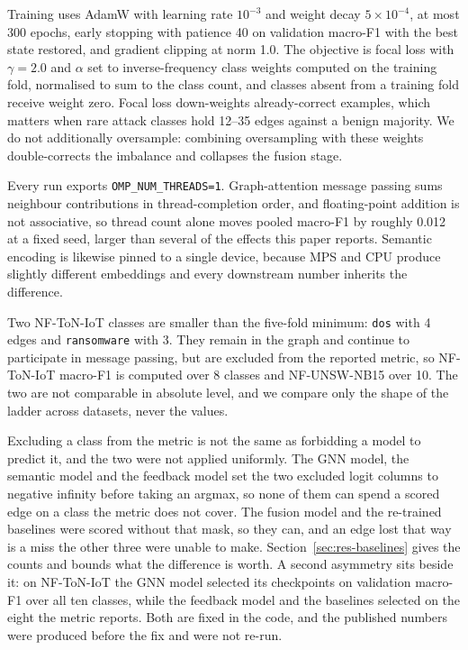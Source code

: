 Training uses AdamW \citep{loshchilov2019adamw} with learning rate $10^{-3}$ and weight decay $5\times10^{-4}$, at most 300
epochs, early stopping with patience 40 on validation macro-F1 with the best state restored,
and gradient clipping at norm 1.0. The objective is focal loss \citep{lin2017focal} with $\gamma = 2.0$ and $\alpha$
set to inverse-frequency class weights computed on the training fold, normalised to sum to the
class count, and classes absent from a training fold receive weight zero. Focal loss down-weights
already-correct examples, which matters when rare attack classes hold 12--35 edges against a
benign majority. We do not additionally oversample: combining oversampling with these weights
double-corrects the imbalance and collapses the fusion stage.

Every run exports \texttt{OMP\_NUM\_THREADS=1}. Graph-attention message passing sums neighbour
contributions in thread-completion order, and floating-point addition is not associative, so
thread count alone moves pooled macro-F1 by roughly 0.012 at a fixed seed, larger than
several of the effects this paper reports. Semantic encoding is likewise pinned to a single
device, because MPS and CPU produce slightly different embeddings and every downstream number
inherits the difference.

Two NF-ToN-IoT classes are smaller than the five-fold minimum: \texttt{dos} with 4 edges and
\texttt{ransomware} with 3. They remain in the graph and continue to participate in message
passing, but are excluded from the reported metric, so NF-ToN-IoT macro-F1 is computed over 8
classes and NF-UNSW-NB15 over 10. The two are not comparable in absolute level, and
we compare only the shape of the ladder across datasets, never the values.

Excluding a class from the metric is not the same as forbidding a model to predict it, and the
two were not applied uniformly. The GNN model, the semantic model and the feedback model set the
two excluded logit columns to negative infinity before taking an argmax, so none of them can
spend a scored edge on a class the metric does not cover. The fusion model and the re-trained
baselines were scored without that mask, so they can, and an edge lost that way is a miss the
other three were unable to make. Section~\ref{sec:res-baselines} gives the counts and bounds
what the difference is worth. A second asymmetry sits beside it: on NF-ToN-IoT the GNN model
selected its checkpoints on validation macro-F1 over all ten classes, while the feedback model
and the baselines selected on the eight the metric reports. Both are fixed in the code, and the
published numbers were produced before the fix and were not re-run.
